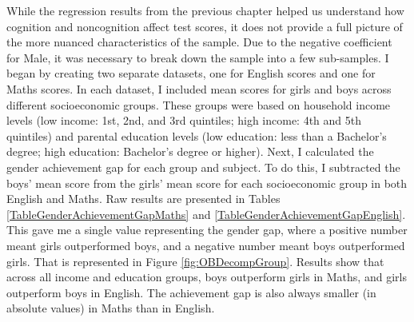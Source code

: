 \documentclass[12pt,a4paper,onecolumn]{article}
\numberwithin{equation}{section}
\begin{document}
While the regression results from the previous chapter helped us understand how cognition and noncognition affect test scores, it does not provide a full picture of the more nuanced characteristics of the sample. Due to the negative coefficient for Male, it was necessary to break down the sample into a few sub-samples. I began by creating two separate datasets, one for English scores and one for Maths scores. In each dataset, I included mean scores for girls and boys across different socioeconomic groups. These groups were based on household income levels (low income: 1st, 2nd, and 3rd quintiles; high income: 4th and 5th quintiles) and parental education levels (low education: less than a Bachelor's degree; high education: Bachelor's degree or higher). Next, I calculated the gender achievement gap for each group and subject. To do this, I subtracted the boys' mean score from the girls' mean score for each socioeconomic group in both English and Maths. Raw results are presented in Tables \ref{TableGenderAchievementGapMaths} and \ref{TableGenderAchievementGapEnglish}. This gave me a single value representing the gender gap, where a positive number meant girls outperformed boys, and a negative number meant boys outperformed girls. That is represented in Figure \ref{fig:OBDecompGroup}. Results show that across all income and education groups, boys outperform girls in Maths, and girls outperform boys in English. The achievement gap is also always smaller (in absolute values) in Maths than in English. 
\end{document}
